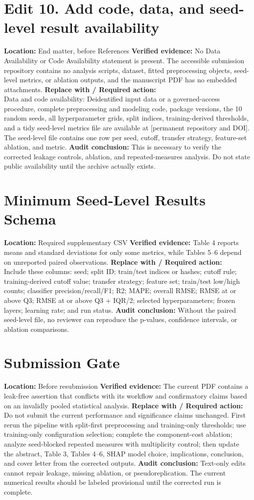 \documentclass[11pt]{article}
\newcommand{\loc}[1]{\textbf{Location:} #1}
\newcommand{\current}[1]{\textbf{Verified evidence:} #1}
\newcommand{\replacewith}[1]{\textbf{Replace with / Required action:}\\{\color{blue}#1}}
\newcommand{\why}[1]{\textbf{Audit conclusion:} #1}
\begin{document}
\section*{Edit 10. Add code, data, and seed-level result availability}
\loc{End matter, before References}
\current{No Data Availability or Code Availability statement is present. The accessible submission repository contains no analysis scripts, dataset, fitted preprocessing objects, seed-level metrics, or ablation outputs, and the manuscript PDF has no embedded attachments.}
\replacewith{Data and code availability: Deidentified input data or a governed-access procedure, complete preprocessing and modeling code, package versions, the 10 random seeds, all hyperparameter grids, split indices, training-derived thresholds, and a tidy seed-level metrics file are available at [permanent repository and DOI]. The seed-level file contains one row per seed, cutoff, transfer strategy, feature-set ablation, and metric.}
\why{This is necessary to verify the corrected leakage controls, ablation, and repeated-measures analysis. Do not state public availability until the archive actually exists.}

\section*{Minimum Seed-Level Results Schema}
\loc{Required supplementary CSV}
\current{Table 4 reports means and standard deviations for only some metrics, while Tables 5--6 depend on unreported paired observations.}
\replacewith{Include these columns: seed; split ID; train/test indices or hashes; cutoff rule; training-derived cutoff value; transfer strategy; feature set; train/test low/high counts; classifier precision/recall/F1; R2; MAPE; overall RMSE; RMSE at or above Q3; RMSE at or above Q3 + IQR/2; selected hyperparameters; frozen layers; learning rate; and run status.}
\why{Without the paired seed-level file, no reviewer can reproduce the p-values, confidence intervals, or ablation comparisons.}

\section*{Submission Gate}
\loc{Before resubmission}
\current{The current PDF contains a leak-free assertion that conflicts with its workflow and confirmatory claims based on an invalidly pooled statistical analysis.}
\replacewith{Do not submit the current performance and significance claims unchanged. First rerun the pipeline with split-first preprocessing and training-only thresholds; use training-only configuration selection; complete the component-cost ablation; analyze seed-blocked repeated measures with multiplicity control; then update the abstract, Table 3, Tables 4--6, SHAP model choice, implications, conclusion, and cover letter from the corrected outputs.}
\why{Text-only edits cannot repair leakage, missing ablation, or pseudoreplication. The current numerical results should be labeled provisional until the corrected run is complete.}
\end{document}
